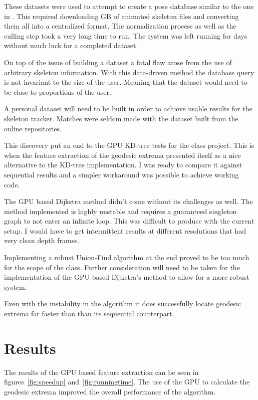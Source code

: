 \documentclass[conference]{IEEEtran}
\begin{document}
These datasets were used to attempt to create a pose database similar to the one in \cite{Baak2011}. This required downloading GB of animated skeleton files and converting them all into a centralized format. The normalization process as well as the culling step took a very long time to run. The system was left running for days without much luck for a completed dataset.

On top of the issue of building a dataset a fatal flaw arose from the use of arbitrary skeleton information. With this data-driven method the database query is not invariant to the size of the user. Meaning that the dataset would need to be close to proportions of the user.

A personal dataset will need to be built in order to achieve usable results for the skeleton tracker. Matches were seldom made with the dataset built from the online repositories.

This discovery put an end to the GPU KD-tree tests for the class project. This is when the feature extraction of the geodesic extrema presented itself as a nice alternative to the KD-tree implementation. I was ready to compare it against sequential results and a simpler workaround was possible to achieve working code.

The GPU based Dijkstra method didn't come without its challenges as well. The method implemented is highly unstable and requires a guaranteed singleton graph to not enter an infinite loop. This was difficult to produce with the current setup. I would have to get intermittent results at different resolutions that had very clean depth frames.

Implementing a robust Union-Find algorithm at the end proved to be too much for the scope of the class. Further consideration will need to be taken for the implementation of the GPU based Dijkstra's method to allow for a more robust system.

Even with the instability in the algorithm it does successfully locate geodesic extrema far faster than than its sequential counterpart.
\section{Results}
\label{sec:results}

The results of the GPU based feature extraction can be seen in figures~\ref{fig:speedup} and~\ref{fig:runningtime}. The use of the GPU to calculate the geodesic extrema improved the overall performance of the algorithm.
\end{document}
